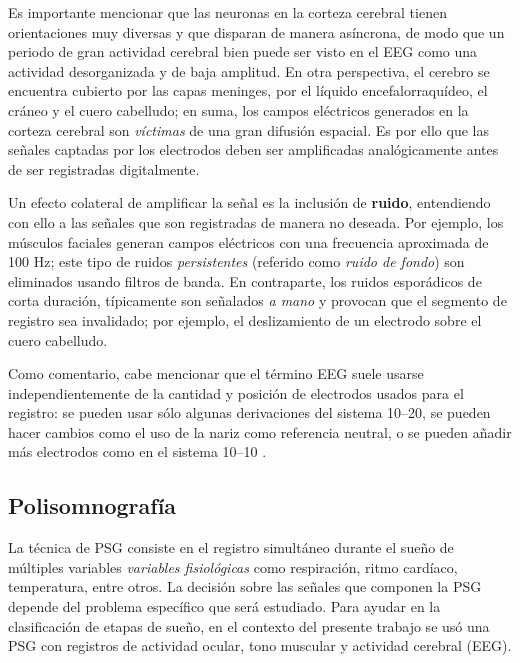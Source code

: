 \documentclass[12pt,letterpaper]{book}
\newcommand{\hz}{\si{\hertz}\xspace}
\begin{document}
Es importante mencionar que las neuronas en la corteza cerebral tienen orientaciones muy diversas y que disparan de manera asíncrona, de modo que un periodo de gran actividad cerebral bien puede ser visto en el EEG como una actividad desorganizada y de baja amplitud.
%
En otra perspectiva, el cerebro se encuentra cubierto por las capas meninges, por el líquido encefalorraquídeo, el cráneo y el cuero cabelludo; en suma, los campos eléctricos generados en la corteza cerebral son \textit{víctimas} de una gran difusión espacial.
%
Es por ello que las señales captadas por los electrodos deben ser amplificadas analógicamente antes de ser registradas digitalmente.

Un efecto colateral de amplificar la señal es la inclusión de \textbf{ruido}, entendiendo con ello a las señales que son registradas de manera no deseada.
%
Por ejemplo, los músculos faciales generan campos eléctricos con una frecuencia aproximada de 100 \hz; este tipo de ruidos \textit{persistentes} (referido como \textit{ruido de fondo}) son eliminados usando filtros de banda.
%
En contraparte, los ruidos esporádicos de corta duración, típicamente son señalados \textit{a mano} y provocan que el segmento de registro sea invalidado; por ejemplo, el deslizamiento de un electrodo sobre el cuero cabelludo.

Como comentario, cabe mencionar que el término EEG suele usarse independientemente de la cantidad y posición de electrodos usados para el registro: se pueden usar sólo algunas derivaciones del sistema 10--20, se pueden hacer cambios como el uso de la nariz como referencia neutral, o se pueden añadir más electrodos como en el sistema 10--10 \cite{Klem99}. 


\subsection{Polisomnografía}
\label{sec:emg_eog}

La técnica de PSG consiste en el registro simultáneo durante el sueño de múltiples variables \textit{variables fisiológicas} como respiración, ritmo cardíaco, temperatura, entre otros.
%
La decisión sobre las señales que componen la PSG depende del problema específico que será estudiado.
%
Para ayudar en la clasificación de etapas de sueño, en el contexto del presente trabajo se usó una PSG con registros de actividad ocular, tono muscular y actividad cerebral (EEG).
\end{document}
